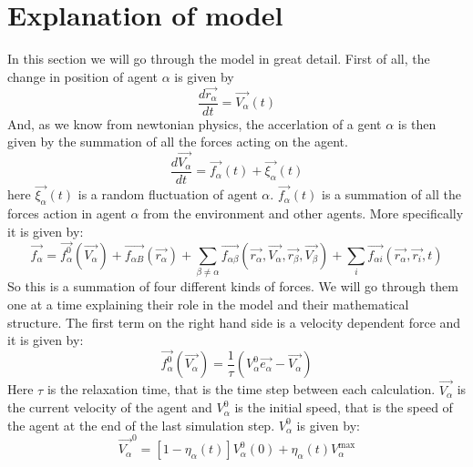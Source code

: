 \section{Explanation of model}
In this section we will go through the model in great detail. First of all, the change in position of agent $\alpha$ is given by
	\begin{equation}
		\frac{d \vec{r_{\alpha}}}{dt} = \vec{V_{\alpha}} \left( t \right)
	\end{equation}
And, as we know from newtonian physics, the accerlation of a gent $\alpha$ is then given by the summation of all the forces acting on the agent.
\begin{equation}
	\frac{d \vec{V_{\alpha}}}{dt} = \vec{f_{\alpha}} \left( t \right) + \vec{\xi_{\alpha}}\left( t \right)
\end{equation}
here $\vec{\xi_{\alpha}} \left( t \right)$ is a random fluctuation of agent $\alpha$. $\vec{f_{\alpha}} \left( t \right)$ is a summation of all the forces action in agent $\alpha$ from the environment and other agents. More specifically it is given by:
\begin{equation}\label{model}
	\vec{f_{\alpha}} = \vec{f^{0}_{\alpha}}\left( \vec{V_{\alpha}} \right) + \vec{f_{\alpha B}} \left( \vec{r_{\alpha}} \right) + \sum_{\beta \neq \alpha} \vec{f_{\alpha \beta}} \left(\vec{r_{\alpha}}, \vec{V_{\alpha}}, \vec{r_{\beta}}, \vec{V_{\beta}} \right) + \sum_{i} \vec{f_{\alpha i}} \left( \vec{r_{\alpha}}, \vec{r_{i}}, t \right)
\end{equation}
So this is a summation of four different kinds of forces. We will go through them one at a time explaining their role in the model and their mathematical structure. The first term on the right hand side is a velocity dependent force and it is given by:
\begin{equation}
	\vec{f^{0}_{\alpha}}\left( \vec{V_{\alpha}} \right) = \frac{1}{\tau} \left( V_{\alpha}^{0} \vec{e_{\alpha}} - \vec{V_{\alpha}} \right)
\end{equation}
Here $\tau$ is the relaxation time, that is the time step between each calculation. $\vec{V_{\alpha}}$ is the current velocity of the agent and $V_{\alpha}^{0}$ is the initial speed, that is the speed of the agent at the end of the last simulation step. $V_{\alpha}^{0}$ is given by:
\begin{equation}
	\vec{V_{\alpha}}^{0} = \left[ 1 - \eta_{\alpha} \left( t \right) \right] V_{\alpha}^{0} \left( 0 \right) + \eta_{\alpha} \left( t \right)V_{\alpha}^{\text{max}}
\end{equation}

